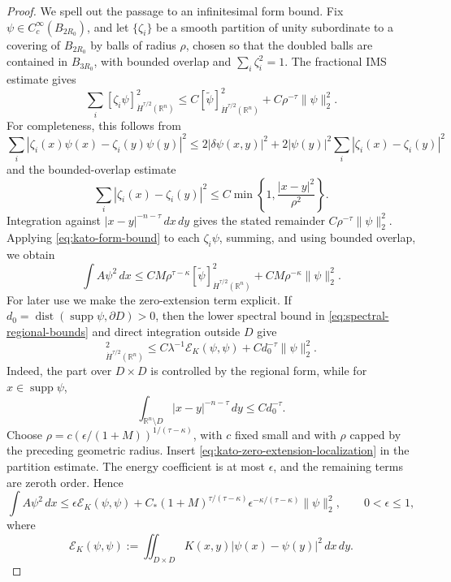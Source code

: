 \documentclass[11pt,reqno]{amsart}
\numberwithin{equation}{section}
\newcommand{\R}{\mathbb R}
\newcommand{\dd}{\,d}
\theoremstyle{remark}
\begin{document}
\begin{proof}
We spell out the passage to an infinitesimal form bound.  Fix
\(\psi\in C_c^\infty(B_{2R_0})\), and let
\(\{\zeta_i\}\) be a smooth partition of unity subordinate to a
covering of \(B_{2R_0}\) by balls of radius \(\rho\), chosen so that
the doubled balls are contained in \(B_{3R_0}\), with bounded overlap
and \(\sum_i\zeta_i^2=1\).  The fractional IMS estimate gives
\[
 \sum_i[\zeta_i\psi]_{\dot H^{\tau/2}(\R^n)}^2
 \le C[\widetilde\psi]_{\dot H^{\tau/2}(\R^n)}^2
      +C\rho^{-\tau}\|\psi\|_2^2.
\]
For completeness, this follows from
\[
 \sum_i|\zeta_i(x)\psi(x)-\zeta_i(y)\psi(y)|^2
 \le2|\delta\psi(x,y)|^2
 +2|\psi(y)|^2\sum_i|\zeta_i(x)-\zeta_i(y)|^2
\]
and the bounded-overlap estimate
\[
 \sum_i|\zeta_i(x)-\zeta_i(y)|^2
 \le C\min\left\{1,\frac{|x-y|^2}{\rho^2}\right\}.
\]
Integration against \(|x-y|^{-n-\tau}\dd x\!\dd y\) gives the stated
remainder \(C\rho^{-\tau}\|\psi\|_2^2\).
Applying \eqref{eq:kato-form-bound} to each \(\zeta_i\psi\), summing,
and using bounded overlap, we obtain
\[
 \int A\psi^2\dd x
 \le CM\rho^{\tau-\kappa}
       [\widetilde\psi]_{\dot H^{\tau/2}(\R^n)}^2
      +CM\rho^{-\kappa}\|\psi\|_2^2.
\]
For later use we make the zero-extension term explicit.  If
\(d_0=\operatorname{dist}(\operatorname{supp}\psi,\partial D)>0\),
then the lower spectral bound in
\eqref{eq:spectral-regional-bounds} and direct integration outside
\(D\) give
\begin{equation}
 [\widetilde\psi]_{\dot H^{\tau/2}(\R^n)}^2
 \le C\lambda^{-1}\mathcal E_K(\psi,\psi)
 +Cd_0^{-\tau}\|\psi\|_2^2.
 \label{eq:kato-zero-extension-localization}
\end{equation}
Indeed, the part over \(D\times D\) is controlled by the regional
form, while for \(x\in\operatorname{supp}\psi\),
\[
 \int_{\R^n\setminus D}|x-y|^{-n-\tau}\dd y
 \le Cd_0^{-\tau}.
\]
Choose
\(\rho=c(\epsilon/(1+M))^{1/(\tau-\kappa)}\), with \(c\) fixed small
and with \(\rho\) capped by the preceding geometric radius.  Insert
\eqref{eq:kato-zero-extension-localization} in the partition estimate.
The energy coefficient is at most \(\epsilon\), and the remaining
terms are zeroth order.  Hence
\begin{equation}
 \int A\psi^2\dd x
 \le \epsilon\mathcal E_K(\psi,\psi)
 +C_*(1+M)^{\tau/(\tau-\kappa)}
       \epsilon^{-\kappa/(\tau-\kappa)}\|\psi\|_2^2,
 \qquad 0<\epsilon\le1,
 \label{eq:kato-infinitesimal-form-bound}
\end{equation}
where
\[
 \mathcal E_K(\psi,\psi)
 :=\iint_{D\times D}K(x,y)|\psi(x)-\psi(y)|^2\dd x\!\dd y.
\]


\end{proof}
\end{document}
